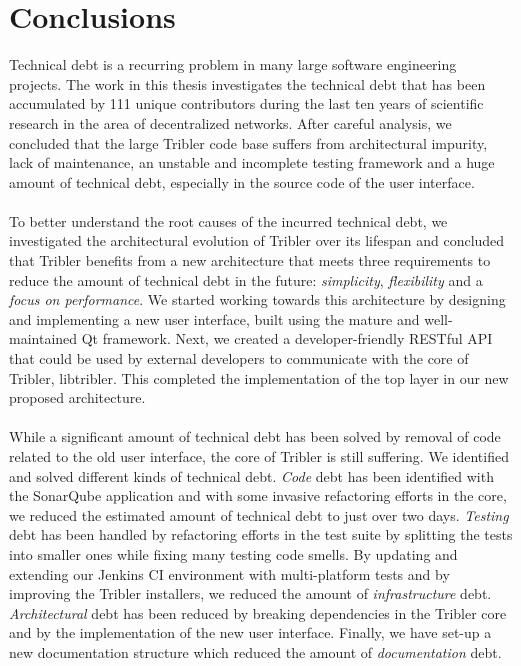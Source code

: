 \chapter{Conclusions}
\label{chapter:conclusions}

Technical debt is a recurring problem in many large software engineering projects. The work in this thesis investigates the technical debt that has been accumulated by 111 unique contributors during the last ten years of scientific research in the area of decentralized networks. After careful analysis, we concluded that the large Tribler code base suffers from architectural impurity, lack of maintenance, an unstable and incomplete testing framework and a huge amount of technical debt, especially in the source code of the user interface.\\\\
To better understand the root causes of the incurred technical debt, we investigated the architectural evolution of Tribler over its lifespan and concluded that Tribler benefits from a new architecture that meets three requirements to reduce the amount of technical debt in the future: \emph{simplicity}, \emph{flexibility} and a \emph{focus on performance}. We started working towards this architecture by designing and implementing a new user interface, built using the mature and well-maintained Qt framework. Next, we created a developer-friendly RESTful API that could be used by external developers to communicate with the core of Tribler, libtribler. This completed the implementation of the top layer in our new proposed architecture.\\\\
While a significant amount of technical debt has been solved by removal of code related to the old user interface, the core of Tribler is still suffering. We identified and solved different kinds of technical debt. \emph{Code} debt has been identified with the SonarQube application and with some invasive refactoring efforts in the core, we reduced the estimated amount of technical debt to just over two days. \emph{Testing} debt has been handled by refactoring efforts in the test suite by splitting the tests into smaller ones while fixing many testing code smells. By updating and extending our Jenkins CI environment with multi-platform tests and by improving the Tribler installers, we reduced the amount of \emph{infrastructure} debt. \emph{Architectural} debt has been reduced by breaking dependencies in the Tribler core and by the implementation of the new user interface. Finally, we have set-up a new documentation structure which reduced the amount of \emph{documentation} debt.\\\\

